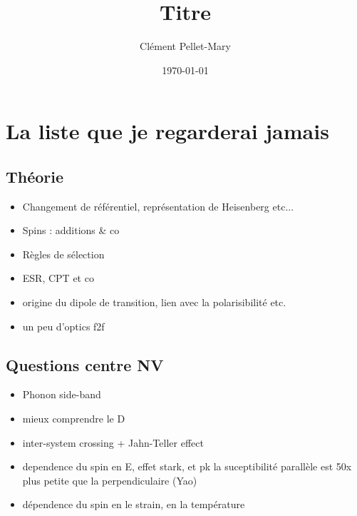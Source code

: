\documentclass[a4paper]{report}
\title{Titre}
\author{Clément Pellet-Mary}
\date\today
\begin{document}
\chapter{La liste que je regarderai jamais}
  \section{Théorie}
  \begin{itemize}
  \item Changement de référentiel, représentation de Heisenberg etc...
  \item Spins : additions \& co
  \item Règles de sélection
  \item ESR, CPT et co
  \item origine du dipole de transition, lien avec la polarisibilité etc.
  \item un peu d'optics f2f
  \end{itemize}
  \section{Questions centre NV}
  \begin{itemize}
  \item Phonon side-band
  \item mieux comprendre le D
  \item inter-system crossing + Jahn-Teller effect
  \item dependence du spin en E, effet stark, et pk la suceptibilité parallèle est 50x plus petite que la perpendiculaire (Yao)
  \item dépendence du spin en le strain, en la température
  \end{itemize}
 
  
\end{document}
